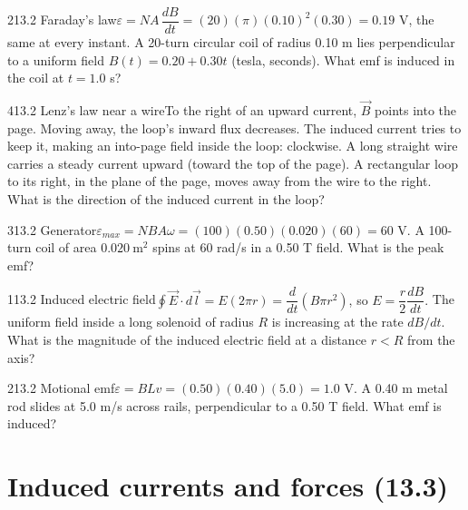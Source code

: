\documentclass[11pt]{article}
\begin{document}
\begin{q}{2}{13.2 Faraday's law}{$\varepsilon = NA\,\dfrac{dB}{dt} = (20)(\pi)(0.10)^2(0.30) = 0.19$ V, the same at every instant.}
A 20-turn circular coil of radius 0.10 m lies perpendicular to a uniform field $B(t) = 0.20 + 0.30t$ (tesla, seconds). What emf is induced in the coil at $t = 1.0$ s?
\end{q}
\begin{q}{4}{13.2 Lenz's law near a wire}{To the right of an upward current, $\vec B$ points into the page. Moving away, the loop's inward flux decreases. The induced current tries to keep it, making an into-page field inside the loop: clockwise.}
A long straight wire carries a steady current upward (toward the top of the page). A rectangular loop to its right, in the plane of the page, moves away from the wire to the right. What is the direction of the induced current in the loop?
\end{q}
\begin{q}{3}{13.2 Generator}{$\varepsilon_{max} = NBA\omega = (100)(0.50)(0.020)(60) = 60$ V.}
A 100-turn coil of area $0.020\ \mathrm{m^2}$ spins at 60 rad/s in a 0.50 T field. What is the peak emf?
\end{q}
\begin{q}{1}{13.2 Induced electric field}{$\oint\vec E\cdot d\vec l = E(2\pi r) = \dfrac{d}{dt}(B\pi r^2)$, so $E = \dfrac{r}{2}\dfrac{dB}{dt}$.}
The uniform field inside a long solenoid of radius $R$ is increasing at the rate $dB/dt$. What is the magnitude of the induced electric field at a distance $r < R$ from the axis?
\end{q}
\begin{q}{2}{13.2 Motional emf}{$\varepsilon = BLv = (0.50)(0.40)(5.0) = 1.0$ V.}
A 0.40 m metal rod slides at 5.0 m/s across rails, perpendicular to a 0.50 T field. What emf is induced?
\end{q}

\section{Induced currents and forces (13.3)}
\end{document}
